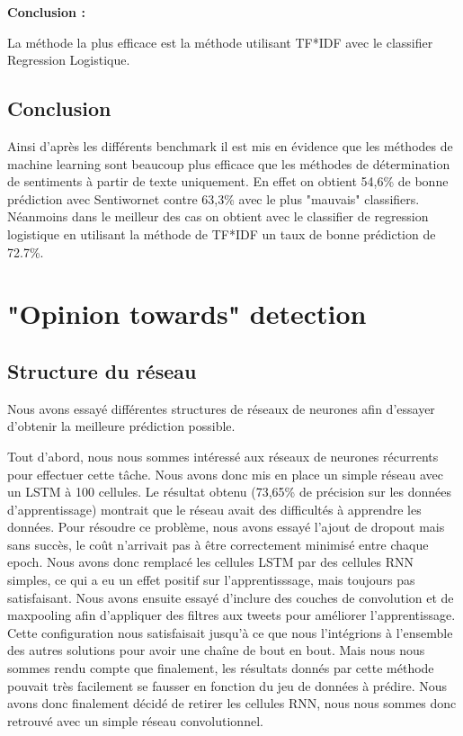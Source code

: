 \par \textbf{Conclusion :} \\
\par La méthode la plus efficace est la méthode utilisant TF*IDF avec le classifier Regression Logistique. \\


\subsection{Conclusion}

\par Ainsi d'après les différents benchmark il est mis en évidence que les méthodes de machine learning sont beaucoup plus efficace que les méthodes de détermination de sentiments à partir de texte uniquement. En effet on obtient 54,6\% de bonne prédiction avec Sentiwornet contre 63,3\% avec le plus "mauvais" classifiers. Néanmoins dans le meilleur des cas on obtient avec le classifier de regression logistique en utilisant la méthode de TF*IDF un taux de bonne prédiction de 72.7\%.

 
\section{"Opinion towards" detection}

\par 

\subsection{Structure du réseau}

\par Nous avons essayé différentes structures de réseaux de neurones afin d'essayer d'obtenir la meilleure prédiction possible.

\par Tout d'abord, nous nous sommes intéressé aux réseaux de neurones récurrents pour effectuer cette tâche. Nous avons donc mis en place un simple réseau avec un LSTM à 100 cellules. Le résultat obtenu (73,65\% de précision sur les données d'apprentissage) montrait que le réseau avait des difficultés à apprendre les données. Pour résoudre ce problème, nous avons essayé l'ajout de dropout mais sans succès, le coût n'arrivait pas à être correctement minimisé entre chaque epoch. Nous avons donc remplacé les cellules LSTM par des cellules RNN simples, ce qui a eu un effet positif sur l'apprentisssage, mais toujours pas satisfaisant. Nous avons ensuite essayé d'inclure des couches de convolution et de maxpooling afin d'appliquer des filtres aux tweets pour améliorer l'apprentissage. Cette configuration nous satisfaisait jusqu'à ce que nous l'intégrions à l'ensemble des autres solutions pour avoir une chaîne de bout en bout. Mais nous nous sommes rendu compte que finalement, les résultats donnés par cette méthode pouvait très facilement se fausser en fonction du jeu de données à prédire. Nous avons donc finalement décidé de retirer les cellules RNN, nous nous sommes donc retrouvé avec un simple réseau convolutionnel.


